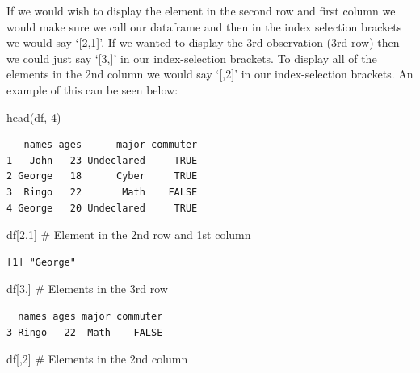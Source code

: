 \documentclass[
  letterpaper,
  DIV=11,
  numbers=noendperiod]{scrreprt}
\newenvironment{Shaded}{\begin{snugshade}}{\end{snugshade}}
\newcommand{\CommentTok}[1]{\textcolor[rgb]{0.37,0.37,0.37}{#1}}
\newcommand{\DecValTok}[1]{\textcolor[rgb]{0.68,0.00,0.00}{#1}}
\newcommand{\FunctionTok}[1]{\textcolor[rgb]{0.28,0.35,0.67}{#1}}
\newcommand{\NormalTok}[1]{\textcolor[rgb]{0.00,0.23,0.31}{#1}}
\begin{document}
If we would wish to display the element in the second row and first
column we would make sure we call our dataframe and then in the index
selection brackets we would say `{[}2,1{]}'. If we wanted to display the
3rd observation (3rd row) then we could just say `{[}3,{]}' in our
index-selection brackets. To display all of the elements in the 2nd
column we would say `{[},2{]}' in our index-selection brackets. An
example of this can be seen below:

\begin{Shaded}
\begin{Highlighting}[]
\FunctionTok{head}\NormalTok{(df, }\DecValTok{4}\NormalTok{)}
\end{Highlighting}
\end{Shaded}

\begin{verbatim}
   names ages      major commuter
1   John   23 Undeclared     TRUE
2 George   18      Cyber     TRUE
3  Ringo   22       Math    FALSE
4 George   20 Undeclared     TRUE
\end{verbatim}

\begin{Shaded}
\begin{Highlighting}[]
\NormalTok{df[}\DecValTok{2}\NormalTok{,}\DecValTok{1}\NormalTok{] }\CommentTok{\# Element in the 2nd row and 1st column}
\end{Highlighting}
\end{Shaded}

\begin{verbatim}
[1] "George"
\end{verbatim}

\begin{Shaded}
\begin{Highlighting}[]
\NormalTok{df[}\DecValTok{3}\NormalTok{,] }\CommentTok{\# Elements in the 3rd row}
\end{Highlighting}
\end{Shaded}

\begin{verbatim}
  names ages major commuter
3 Ringo   22  Math    FALSE
\end{verbatim}

\begin{Shaded}
\begin{Highlighting}[]
\NormalTok{df[,}\DecValTok{2}\NormalTok{] }\CommentTok{\# Elements in the 2nd column}
\end{Highlighting}
\end{Shaded}
\end{document}
